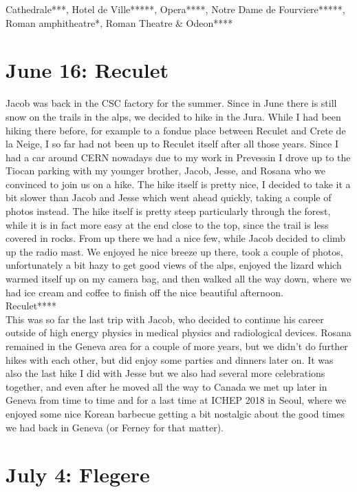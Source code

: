 Cathedrale***, Hotel de Ville*****, Opera****, Notre Dame de Fourviere*****, Roman amphitheatre*, Roman Theatre \& Odeon****\\

\section{June 16: Reculet}
\label{Reculet2013}

Jacob was back in the CSC factory for the summer. Since in June there is still snow on the trails in the alps, we decided to hike in the Jura. While I had been hiking there before, for example to a fondue place between Reculet and Crete de la Neige, I so far had not been up to Reculet itself after all those years. Since I had a car around CERN nowadays due to my work in Prevessin I drove up to the Tiocan parking with my younger brother, Jacob, Jesse, and Rosana who we convinced to join us on a hike. The hike itself is pretty nice, I decided to take it a bit slower than Jacob and Jesse which went ahead quickly, taking a couple of photos instead. The hike itself is pretty steep particularly through the forest, while it is in fact more easy at the end close to the top, since the trail is less covered in rocks. From up there we had a nice few, while Jacob decided to climb up the radio mast. We enjoyed he nice breeze up there, took a couple of photos, unfortunately a bit hazy to get good views of the alps, enjoyed the lizard which warmed itself up on my camera bag, and then walked all the way down, where we had ice cream and coffee to finish off the nice beautiful afternoon.\\

Reculet****\\

This was so far the last trip with Jacob, who decided to continue his career outside of high energy physics in medical physics and radiological devices. Rosana remained in the Geneva area for a couple of more years, but we didn't do further hikes with each other, but did enjoy some parties and dinners later on. It was also the last hike I did with Jesse but we also had several more celebrations together, and even after he moved all the way to Canada we met up later in Geneva from time to time and for a last time at ICHEP 2018 in Seoul, where we enjoyed some nice Korean barbecue getting a bit nostalgic about the good times we had back in Geneva (or Ferney for that matter).

\section{July 4: Flegere}
\label{Flegere2013}

